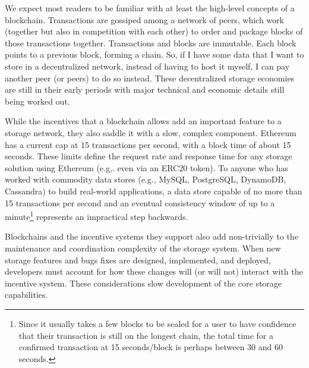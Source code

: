 \documentclass[10pt]{article}
\begin{document}
We expect most readers to be familiar with at least the high-level concepts of a blockchain. Transactions are gossiped among a network of peers, which work (together but also in competition with each other) to order and package blocks of those transactions together. Transactions and blocks are immutable. Each block points to a previous block, forming a chain. So, if I have some data that I want to store in a decentralized network, instead of having to host it myself, I can pay another peer (or peers) to do so instead. These decentralized storage economies are still in their early periods with major technical and economic details still being worked out.

While the incentives that a blockchain allows add an important feature to a storage network, they also saddle it with a slow, complex component. Ethereum has a current cap at 15 transactions per second, with a block time of about 15 seconds. These limits define the request rate and response time for any storage solution using Ethereum (e.g,. even via an ERC20 token). To anyone who has worked with commodity data stores (e.g., MySQL, PostgreSQL, DynamoDB, Cassandra) to build real-world applications, a data store capable of no more than 15 transactions per second and an eventual consistency window of up to a minute\footnote{Since it usually takes a few blocks to be sealed for a user to have confidence that their transaction is still on the longest chain, the total time for a confirmed transaction at 15 seconds/block is perhaps between 30 and 60 seconds.} represents an impractical step backwards.

Blockchains and the incentive systems they support also add non-trivially to the maintenance and coordination complexity of the storage system. When new storage features and bugs fixes are designed, implemented, and deployed, developers must account for how these changes will (or will not) interact with the incentive system. These considerations slow development of the core storage capabilities. 
\end{document}
